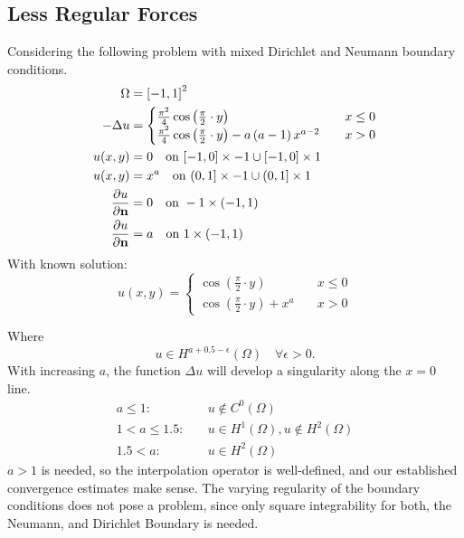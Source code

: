 \documentclass[11pt,a4paper]{article}
\begin{document}
\begin{multicols}{2}
\subsection*{Less Regular Forces}
Considering the following problem with mixed Dirichlet and Neumann boundary conditions.
\begin{equation}
  \label{eq:poisson_less_smooth_prob}
  \begin{split}
    \Omega &= \left[-1,1\right]^2\\
    -\Delta u &= \begin{cases}
      \frac{\pi^2}{4} \operatorname{cos}\left(\frac{\pi}{2} \cdot y\right) \quad &x \le 0\\
      \frac{\pi^2}{4} \operatorname{cos}\left(\frac{\pi}{2} \cdot y\right) - a\left(a-1\right)x^{a-2} \quad &x > 0
    \end{cases}\\
    u(x,y) &= 0 \quad \text{on } [-1,0] \times -1 \cup [-1,0] \times 1\\
    u(x,y) &= x^a \quad \text{on } (0,1] \times -1 \cup (0,1] \times 1\\
    \frac{\partial u}{\partial {\bf n}} &= 0 \quad \text{on } -1 \times (-1,1)\\
    \frac{\partial u}{\partial {\bf n}} &= a \quad \text{on } 1 \times (-1,1)
  \end{split}
\end{equation}
With known solution:
\begin{equation*}
  u(x,y) = \begin{cases}
    \operatorname{cos}\left(\frac{\pi}{2} \cdot y\right) \quad &x \le 0\\
    \operatorname{cos}\left(\frac{\pi}{2} \cdot y\right) + x^a \quad &x > 0
  \end{cases}
\end{equation*}

Where
$$u \in H^{a+0.5 - \epsilon}(\Omega) \quad \forall \epsilon > 0.$$
With increasing $a$, the function $\Delta u$ will develop a singularity along the $x = 0$ line.
\begin{equation}
  \begin{split}
    a \le 1: \quad &u \notin C^0(\Omega)\\
    1 < a \le 1.5: \quad &u \in H^1(\Omega), u \notin H^2(\Omega) \\
    1.5 < a: \quad &u\in H^2(\Omega)
  \end{split}
\end{equation}
$a > 1$ is needed, so the interpolation operator is well-defined, and our established
convergence estimates make sense.
The varying regularity of the boundary conditions does not pose a problem, since only
square integrability for both, the Neumann, and Dirichlet Boundary is needed.


\end{multicols}
\end{document}
